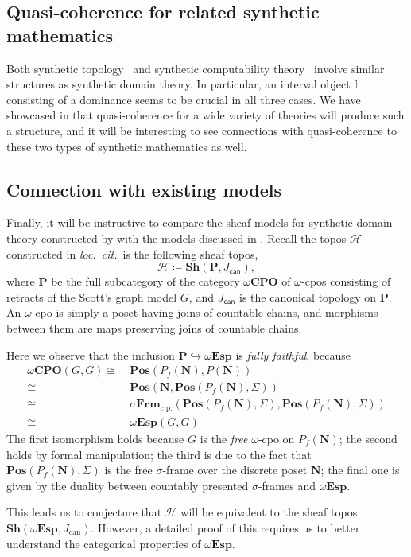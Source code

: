 \documentclass[a4paper,12pt]{amsart}
\theoremstyle{definition}
\newcommand{\mc}[1]{\mathcal{#1}}
\newcommand{\mb}[1]{\mathbf{#1}}
\newcommand{\mbb}[1]{\mathbb{#1}}
\newcommand{\I}{\mbb I}
\newcommand{\mr}[1]{\mathrm{#1}}
\newcommand{\ms}[1]{\mathsf{#1}}
\newcommand{\Pos}{\mb{Pos}}
\newcommand{\sh}{\mb{Sh}}
\newcommand{\hook}{\hookrightarrow}
\newcommand{\cp}{_{\mr{c.p.}}}
\newcommand{\N}{\mb N}
\newcommand{\wCPO}{\omega\mb{CPO}}
\newcommand{\sFrm}{\sigma\mb{Frm}}
\newcommand{\wTop}{\omega\mb{Esp}}
\begin{document}

\subsection{Quasi-coherence for related synthetic mathematics}

Both synthetic topology~\citep{bauer2009dedekind} and synthetic computability theory~\citep{RN552} involve similar structures as synthetic domain theory. In particular, an interval object $\I$ consisting of a dominance seems to be crucial in all three cases. We have showcased in  that quasi-coherence for a wide variety of theories will produce such a structure, and it will be interesting to see connections with quasi-coherence to these two types of synthetic mathematics as well.

\subsection{Connection with existing models}\label{subsec:compare}

Finally, it will be instructive to compare the sheaf models for synthetic domain theory constructed by \citet{FIORE1997151} with the models discussed in . Recall the topos $\mc H$ constructed in \emph{loc.\ cit.}\ is the following sheaf topos,
\[ \mc H \coloneq \sh(\mb P,J_{\ms{can}}), \]
where $\mb P$ be the full subcategory of the category $\wCPO$ of $\omega$-cpos consisting of retracts of the Scott's graph model $G$, and $J_{\ms{can}}$ is the canonical topology on $\mb P$. An $\omega$-cpo is simply a poset having joins of countable chains, and morphisms between them are maps preserving joins of countable chains.

Here we observe that the inclusion $\mb P \hook \wTop$ is \emph{fully faithful}, because
\begin{align*}
  \wCPO(G,G)
  \cong\ & \Pos(P_f(\N),P(\N)) \\
  \cong\ & \Pos(\N,\Pos(P_f(\N),\Sigma)) \\
  \cong\ & \sFrm\cp(\Pos(P_f(\N),\Sigma),\Pos(P_f(\N),\Sigma)) \\ 
  \cong\ & \wTop(G,G)
\end{align*}
The first isomorphism holds because $G$ is the \emph{free} $\omega$-cpo on $P_f(\N)$; the second holds by formal manipulation; the third is due to the fact that $\Pos(P_f(\N),\Sigma)$ is the free $\sigma$-frame over the discrete poset $\N$; the final one is given by the duality between countably presented $\sigma$-frames and $\wTop$. 

This leads us to conjecture that $\mc H$ will be equivalent to the sheaf topos $\sh(\wTop,J_{\mr{can}})$. However, a detailed proof of this requires us to better understand the categorical properties of $\wTop$.

 

\end{document}
